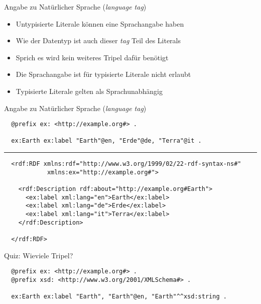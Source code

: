 \documentclass{beamer}
\begin{document}
\begin{frame}{Angabe zu Natürlicher Sprache (\emph{language tag})}
	
	\begin{itemize}
		\item Untypisierte Literale können eine Sprachangabe haben
		\item Wie der Datentyp ist auch dieser \emph{tag} Teil des Literals
		\item Sprich es wird kein weiteres Tripel dafür benötigt
		\item Die Sprachangabe ist für typisierte Literale nicht erlaubt
		\item Typisierte Literale gelten als Sprachunabhängig
	\end{itemize}
	
\end{frame}

\begin{frame}[fragile]{Angabe zu Natürlicher Sprache (\emph{language tag})}
	
	\small
	\begin{lstlisting}
  @prefix ex: <http://example.org#> .
	
  ex:Earth ex:label "Earth"@en, "Erde"@de, "Terra"@it .
	\end{lstlisting}
	
	\vspace{0.2cm}
	
	\centering\noindent\rule{8cm}{0.4pt}
	
	\vspace{0.2cm}
	
	\small
	\begin{lstlisting}	
  <rdf:RDF xmlns:rdf="http://www.w3.org/1999/02/22-rdf-syntax-ns#"
            xmlns:ex="http://example.org#">

    <rdf:Description rdf:about="http://example.org#Earth">
      <ex:label xml:lang="en">Earth</ex:label>
      <ex:label xml:lang="de">Erde</ex:label>
      <ex:label xml:lang="it">Terra</ex:label>
    </rdf:Description>

  </rdf:RDF>		
	\end{lstlisting}
	
\end{frame}

\begin{frame}[fragile]{Quiz: Wieviele Tripel?}
	
	\small
	\begin{lstlisting}
  @prefix ex: <http://example.org#> .
  @prefix xsd: <http://www.w3.org/2001/XMLSchema#> . 
	
  ex:Earth ex:label "Earth", "Earth"@en, "Earth"^^xsd:string .
	\end{lstlisting}
	
\end{frame}
\end{document}
